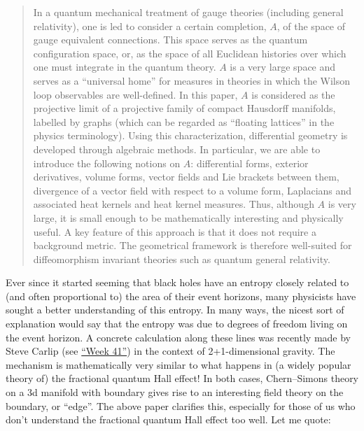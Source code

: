 \documentclass[12pt]{article}
\def\tightlist{}
\renewcommand{\texttt}[1]{%
  \begingroup
  \ttfamily
  \begingroup\lccode`~=`/\lowercase{\endgroup\def~}{/\discretionary{}{}{}}%
  \begingroup\lccode`~=`[\lowercase{\endgroup\def~}{[\discretionary{}{}{}}%
  \begingroup\lccode`~=`.\lowercase{\endgroup\def~}{.\discretionary{}{}{}}%
  \catcode`/=\active\catcode`[=\active\catcode`.=\active
  \scantokens{#1\noexpand}%
  \endgroup
}
\begin{document}
\begin{quote}
In a quantum mechanical treatment of gauge theories (including general
relativity), one is led to consider a certain completion, \(A\), of the
space of gauge equivalent connections. This space serves as the quantum
configuration space, or, as the space of all Euclidean histories over
which one must integrate in the quantum theory. \(A\) is a very large
space and serves as a ``universal home'' for measures in theories in
which the Wilson loop observables are well-defined. In this paper, \(A\)
is considered as the projective limit of a projective family of compact
Hausdorff manifolds, labelled by graphs (which can be regarded as
``floating lattices'' in the physics terminology). Using this
characterization, differential geometry is developed through algebraic
methods. In particular, we are able to introduce the following notions
on \(A\): differential forms, exterior derivatives, volume forms, vector
fields and Lie brackets between them, divergence of a vector field with
respect to a volume form, Laplacians and associated heat kernels and
heat kernel measures. Thus, although \(A\) is very large, it is small
enough to be mathematically interesting and physically useful. A key
feature of this approach is that it does not require a background
metric. The geometrical framework is therefore well-suited for
diffeomorphism invariant theories such as quantum general relativity.
\end{quote}


Ever since it started seeming that black holes have an entropy closely
related to (and often proportional to) the area of their event horizons,
many physicists have sought a better understanding of this entropy. In
many ways, the nicest sort of explanation would say that the entropy was
due to degrees of freedom living on the event horizon. A concrete
calculation along these lines was recently made by Steve Carlip (see
\protect\hyperlink{week41}{``Week 41''}) in the context of
2+1-dimensional gravity. The mechanism is mathematically very similar to
what happens in (a widely popular theory of) the fractional quantum Hall
effect! In both cases, Chern--Simons theory on a 3d manifold with
boundary gives rise to an interesting field theory on the boundary, or
``edge''. The above paper clarifies this, especially for those of us who
don't understand the fractional quantum Hall effect too well. Let me
quote:
\end{document}
